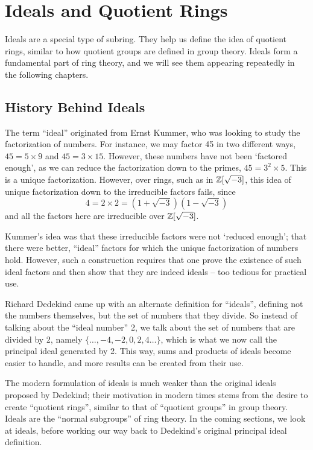 \chapter{Ideals and Quotient Rings}
Ideals are a special type of subring. They help us define the idea of quotient rings, similar to how quotient groups are defined in group theory. Ideals form a fundamental part of ring theory, and we will see them appearing repeatedly in the following chapters.

\section{History Behind Ideals}
The term ``ideal'' originated from Ernst Kummer, who was looking to study the factorization of numbers. For instance, we may factor 45 in two different ways, $45 = 5 \times 9$ and $45 = 3 \times 15$. However, these numbers have not been `factored enough', as we can reduce the factorization down to the primes, $45 = 3^2 \times 5$. This is a unique factorization. However, over rings, such as in $\mathbb{Z}[\sqrt{-3}]$, this idea of unique factorization down to the irreducible factors fails, since
\[
    4 = 2 \times 2 = (1+\sqrt{-3})(1-\sqrt{-3})
\]
and all the factors here are irreducible over $\mathbb{Z}[\sqrt{-3}]$.

Kummer's idea was that these irreducible factors were not `reduced enough'; that there were better, ``ideal'' factors for which the unique factorization of numbers hold. However, such a construction requires that one prove the existence of such ideal factors and then show that they are indeed ideals -- too tedious for practical use.

Richard Dedekind came up with an alternate definition for ``ideals'', defining not the numbers themselves, but the set of numbers that they divide. So instead of talking about the ``ideal number'' 2, we talk about the set of numbers that are divided by 2, namely $\{\dots, -4, -2, 0, 2, 4 \dots\}$, which is what we now call the principal ideal generated by 2. This way, sums and products of ideals become easier to handle, and more results can be created from their use.

The modern formulation of ideals is much weaker than the original ideals proposed by Dedekind; their motivation in modern times stems from the desire to create ``quotient rings'', similar to that of ``quotient groups'' in group theory. Ideals are the ``normal subgroups'' of ring theory. In the coming sections, we look at ideals, before working our way back to Dedekind's original principal ideal definition.



